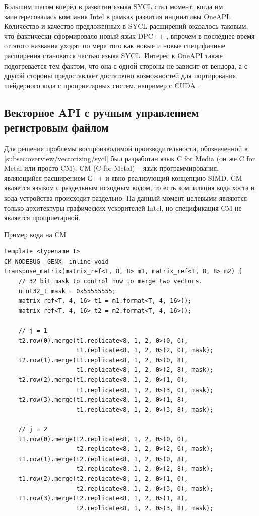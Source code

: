 Большим шагом вперёд в развитии языка SYCL стал момент, когда им заинтересовалась компания Intel в рамках развития инцииативы OneAPI. Количество и качество предложенных в SYCL расширений оказалось таковым, что фактически сформировало новый язык DPC++ \cite{ashbaugh2020data}, впрочем в последнее время от этого названия уходят по мере того как новые и новые специфичные расширения становятся частью языка SYCL. Интерес к OneAPI также подогревается тем фактом, что она с одной стороны не зависит от вендора, а с другой стороны предоставляет достаточно возможностей для портирования шейдерного кода с проприетарных систем, например с CUDA \cite{christgau2020porting}.

\subsection{Векторное API с ручным управлением регистровым файлом}\label{subsec:overview/vectorizing/cm}

Для решения проблемы воспроизводимой производительности, обозначенной в \cref{subsec:overview/vectorizing/sycl} был разработан язык C for Media (он же C for Metal или просто CM). CM (C-for-Metal) \cite{lueh2021c} -- язык программирования, являющийся расширением С++ и явно реализующий концепцию SIMD. CM является языком с раздельным исходным кодом, то есть компиляция кода хоста и кода устройства происходит раздельно. На данный момент целевыми являются только архитектуры графических ускорителей Intel, но спецификация CM не является проприетарной.

\begin{ListingEnv}[!h]
    \captiondelim{ } 
    \caption{Пример кода на CM}\label{lst:cmshader}
    \begin{lstlisting}[language={[ISO]C++}]
template <typename T>
CM_NODEBUG _GENX_ inline void
transpose_matrix(matrix_ref<T, 8, 8> m1, matrix_ref<T, 8, 8> m2) {
    // 32 bit mask to control how to merge two vectors.
    uint32_t mask = 0x55555555;
    matrix_ref<T, 4, 16> t1 = m1.format<T, 4, 16>();
    matrix_ref<T, 4, 16> t2 = m2.format<T, 4, 16>();

    // j = 1
    t2.row(0).merge(t1.replicate<8, 1, 2, 0>(0, 0), 
                    t1.replicate<8, 1, 2, 0>(2, 0), mask);
    t2.row(1).merge(t1.replicate<8, 1, 2, 0>(0, 8), 
                    t1.replicate<8, 1, 2, 0>(2, 8), mask);
    t2.row(2).merge(t1.replicate<8, 1, 2, 0>(1, 0), 
                    t1.replicate<8, 1, 2, 0>(3, 0), mask);
    t2.row(3).merge(t1.replicate<8, 1, 2, 0>(1, 8), 
                    t1.replicate<8, 1, 2, 0>(3, 8), mask);

    // j = 2
    t1.row(0).merge(t2.replicate<8, 1, 2, 0>(0, 0), 
                    t2.replicate<8, 1, 2, 0>(2, 0), mask);
    t1.row(1).merge(t2.replicate<8, 1, 2, 0>(0, 8), 
                    t2.replicate<8, 1, 2, 0>(2, 8), mask);
    t1.row(2).merge(t2.replicate<8, 1, 2, 0>(1, 0),
                    t2.replicate<8, 1, 2, 0>(3, 0), mask);
    t1.row(3).merge(t2.replicate<8, 1, 2, 0>(1, 8),
                    t2.replicate<8, 1, 2, 0>(3, 8), mask);
    \end{lstlisting}
\end{ListingEnv}

